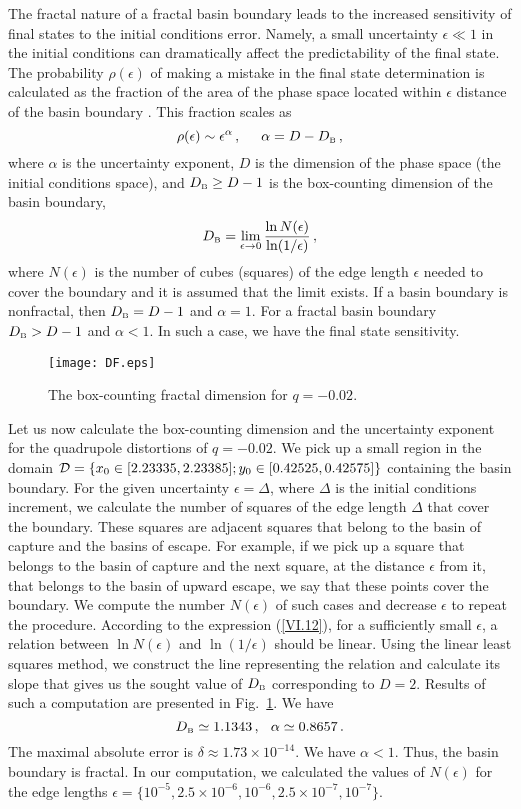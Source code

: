\documentclass[twocolumn,showpacs,preprintnumbers,amsmath,amssymb,floatfix,nofootinbib]{revtex4-1}
\newcommand{\be}{\begin{equation}}
\newcommand{\ee}{\end{equation}}
\newcommand{\eq}[1]{(\ref{#1})}
\newcommand{\n}[1]{\label{#1}}
\newcommand{\hh}{\hspace{0.25cm}}
\newcommand{\hhh}{\, ,\hspace{0.5cm}}
\newcommand{\ind}[1]{\mbox{\tiny #1}}
\begin{document}
The fractal nature of a fractal basin boundary leads to the increased sensitivity of final states to the initial conditions error. Namely, a small uncertainty $\epsilon\ll 1$ in the initial conditions can dramatically affect the predictability of the final state. The probability $\rho(\epsilon)$ of making a mistake in the final state determination is calculated as the fraction of the area of the phase space located within $\epsilon$ distance of the basin boundary \cite{MGOY,Ott}. This fraction scales as
\be\n{VI.12}
\rho(\epsilon)\sim\epsilon^\alpha\hhh \alpha=D-D_{\ind{B}}\,,
\ee
where $\alpha$ is the uncertainty exponent, $D$ is the dimension of the phase space (the initial conditions space), and $D_{\ind{B}}\geq D-1$ is the box-counting dimension of the basin boundary,
\be\n{VI.13}
D_{\ind{B}}=\lim_{\epsilon\to0}\frac{\ln N(\epsilon)}{\ln(1/\epsilon)}\,,
\ee
where $N(\epsilon)$ is the number of cubes (squares) of the edge length $\epsilon$ needed to cover the boundary and it is assumed that the limit exists. If a basin boundary is nonfractal, then $D_{\ind{B}}=D-1$ and $\alpha=1$. For a fractal basin boundary $D_{\ind{B}}>D-1$ and $\alpha<1$.  In such a case, we have the final state sensitivity. 

\begin{figure}[htb]
\begin{center}
\hspace{0cm}
\texttt{[image: DF.eps]}
\caption{The box-counting fractal dimension for $q=-0.02$.} \label{fig9}
\end{center}
\end{figure}

Let us now calculate the box-counting dimension and the uncertainty exponent for the quadrupole distortions of $q=-0.02$. We pick up a small region in the domain ${\cal D}=\{x_0\in[2.23335, 2.23385]; y_0\in[0.42525, 0.42575]\}$ containing the basin boundary. For the given uncertainty $\epsilon=\Delta$, where $\Delta$ is the initial conditions increment, we calculate the number of squares of the edge length $\Delta$ that cover the boundary. These squares are adjacent squares that belong to the basin of capture and the basins of escape. For example, if we pick up a square that belongs to the basin of capture and the next square, at the distance $\epsilon$ from it, that belongs to the basin of upward escape, we say that these points cover the boundary. We compute the number $N(\epsilon)$ of such cases and decrease $\epsilon$ to repeat the procedure.  According to the expression \eq{VI.12}, for a sufficiently small $\epsilon$, a relation between $\ln N(\epsilon)$ and $\ln(1/\epsilon)$ should be linear. Using the linear least squares method, we construct the line representing the relation and calculate its slope that gives us the sought value of $D_{\ind{B}}$ corresponding to $D=2$. Results of such a computation are presented in Fig.~\ref{fig9}. We have
\be
D_{\ind{B}}\simeq1.1343\,,\hh\alpha\simeq0.8657\,.\n{VI.14}
\ee 
The maximal absolute error is $\delta\approx1.73\times10^{-14}$. We have $\alpha<1$. Thus, the basin boundary is fractal. In our computation, we calculated the values of $N(\epsilon)$ for the edge lengths $\epsilon=\{10^{-5},2.5\times10^{-6},10^{-6},2.5\times10^{-7},10^{-7}\}$. 
\end{document}
